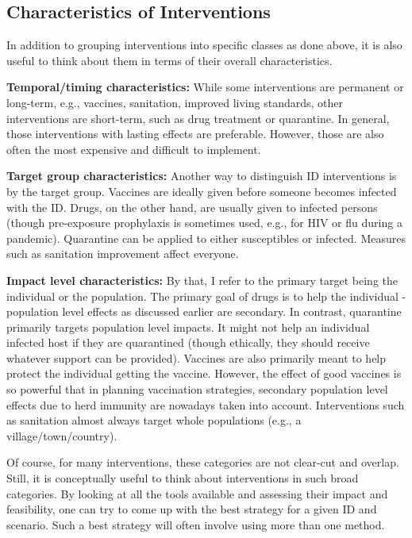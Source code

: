 \documentclass[]{article}
\theoremstyle{definition}
\theoremstyle{definition}
\theoremstyle{definition}
\theoremstyle{remark}
\begin{document}
\subsection{Characteristics of
Interventions}\label{characteristics-of-interventions}

In addition to grouping interventions into specific classes as done
above, it is also useful to think about them in terms of their overall
characteristics.

\textbf{Temporal/timing characteristics:} While some interventions are
permanent or long-term, e.g., vaccines, sanitation, improved living
standards, other interventions are short-term, such as drug treatment or
quarantine. In general, those interventions with lasting effects are
preferable. However, those are also often the most expensive and
difficult to implement.

\textbf{Target group characteristics:} Another way to distinguish ID
interventions is by the target group. Vaccines are ideally given before
someone becomes infected with the ID. Drugs, on the other hand, are
usually given to infected persons (though pre-exposure prophylaxis is
sometimes used, e.g., for HIV or flu during a pandemic). Quarantine can
be applied to either susceptibles or infected. Measures such as
sanitation improvement affect everyone.

\textbf{Impact level characteristics:} By that, I refer to the primary
target being the individual or the population. The primary goal of drugs
is to help the individual - population level effects as discussed
earlier are secondary. In contrast, quarantine primarily targets
population level impacts. It might not help an individual infected host
if they are quarantined (though ethically, they should receive whatever
support can be provided). Vaccines are also primarily meant to help
protect the individual getting the vaccine. However, the effect of good
vaccines is so powerful that in planning vaccination strategies,
secondary population level effects due to herd immunity are nowadays
taken into account. Interventions such as sanitation almost always
target whole populations (e.g., a village/town/country).

Of course, for many interventions, these categories are not clear-cut
and overlap. Still, it is conceptually useful to think about
interventions in such broad categories. By looking at all the tools
available and assessing their impact and feasibility, one can try to
come up with the best strategy for a given ID and scenario. Such a best
strategy will often involve using more than one method.
\end{document}
